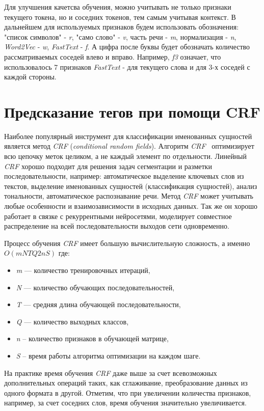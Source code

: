 \documentclass{csmathnotes}
\begin{document}
Для улучшения качетсва обучения, можно учитывать не только признаки текущего токена, но и соседних токенов, тем самым учитывая контекст.
В дальнейшем для используемых признаков будем использовать обозначения: "список символов" - \emph{r}, "само слово" - \emph{v}, часть речи - \emph{m}, нормализация - \emph{n}, \emph{Word2Vec} - \emph{w}, \emph{FastText} - \emph{f}.
А цифра после буквы будет обозначать количество рассматриваемых соседей влево и вправо.
Например, \emph{f3} означает, что использовалось 7 признаков \emph{FastText} - для текущего слова и для 3-х соседей с каждой стороны.

\section*{Предсказание тегов при помощи CRF}
Наиболее  популярный инструмент для классификации именованных сущностей является метод \emph{CRF} (\emph{conditional random fields}). 
Алгоритм \emph{CRF}~\cite{HabrCRF} оптимизирует всю цепочку меток целиком, а не каждый элемент по отдельности.
Линейный \emph{CRF} хорошо подходит для решения задач сегментации и разметки последовательности,
например: автоматическое выделение ключевых слов из текстов, выделение именованных сущностей (классификация сущностей), анализ тональности, автоматическое распознавание речи.
Метод \emph{CRF} может учитывать любые особенности и взаимозависимости в исходных данных. Так же он хорошо работает в связке с рекуррентными нейросетями, моделирует совместное распределение на всей последовательности выходов сети одновременно.


Процесс обучения \emph{CRF} имеет большую вычислительную сложность, а именно $O(mNTQ2nS)$ где:
\begin{itemize}
    \item \emph{m} — количество тренировочных итераций,
    \item \emph{N} — количество обучающих последовательностей,
    \item \emph{T} — средняя длина обучающей последовательности,
    \item \emph{Q} — количество выходных классов,
    \item \emph{n} – количество признаков в обучающей матрице,
    \item \emph{S} – время работы алгоритма оптимизации на каждом шаге. 
\end{itemize}


На практике время обучения \emph{CRF} даже выше за счет всевозможных дополнительных операций таких, как сглаживание, преобразование данных из одного формата в другой.
Отметим, что при увеличении количества признаков, например, за счет соседних слов, время обучения значительно увеличивается. 
\end{document}
